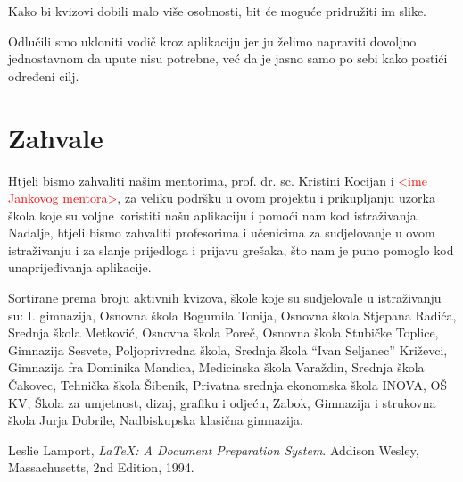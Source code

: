 \documentclass{scrreprt}
\begin{document}
Kako bi kvizovi dobili malo više osobnosti, bit će moguće pridružiti im slike.

Odlučili smo ukloniti vodič kroz aplikaciju jer ju želimo napraviti dovoljno
jednostavnom da upute nisu potrebne, već da je jasno samo po sebi kako postići
određeni cilj.

\chapter{Zahvale}

Htjeli bismo zahvaliti našim mentorima, prof. dr. sc. Kristini Kocijan i
\textcolor{red}{<ime Jankovog mentora>}, za veliku podršku u ovom projektu i
prikupljanju uzorka škola koje su voljne koristiti našu aplikaciju i pomoći nam
kod istraživanja. Nadalje, htjeli bismo zahvaliti profesorima i učenicima za
sudjelovanje u ovom istraživanju i za slanje prijedloga i prijavu grešaka, što
nam je puno pomoglo kod unaprijeđivanja aplikacije.

Sortirane prema broju aktivnih kvizova, škole koje su sudjelovale u istraživanju
su: I. gimnazija, Osnovna škola Bogumila Tonija, Osnovna škola Stjepana Radića,
Srednja škola Metković, Osnovna škola Poreč, Osnovna škola Stubičke Toplice,
Gimnazija Sesvete, Poljoprivredna škola, Srednja škola ``Ivan Seljanec''
Križevci, Gimnazija fra Dominika Mandica, Medicinska škola Varaždin, Srednja
škola Čakovec, Tehnička škola Šibenik, Privatna srednja ekonomska škola INOVA,
OŠ KV, Škola za umjetnost, dizaj, grafiku i odjeću, Zabok, Gimnazija i strukovna
škola Jurja Dobrile, Nadbiskupska klasična gimnazija.

\begin{thebibliography}{9}
   Leslie Lamport, \emph{\LaTeX: A Document Preparation
    System}. Addison Wesley, Massachusetts, 2nd Edition, 1994.
\end{thebibliography}
\end{document}
